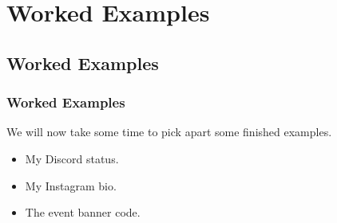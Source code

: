 \documentclass[handout,xcolor]{beamer}
\begin{document}
\section{Worked Examples}

\subsection{Worked Examples}

\begin{frame}
	\frametitle{Worked Examples}
	\pause
	
	We will now take some time to pick apart some finished examples.
	\pause
	
	\begin{itemize}
		\item My Discord status.
		\pause
		
		\item My Instagram bio.
		\pause
		
		\item The event banner code.
	\end{itemize}
\end{frame}
\end{document}
